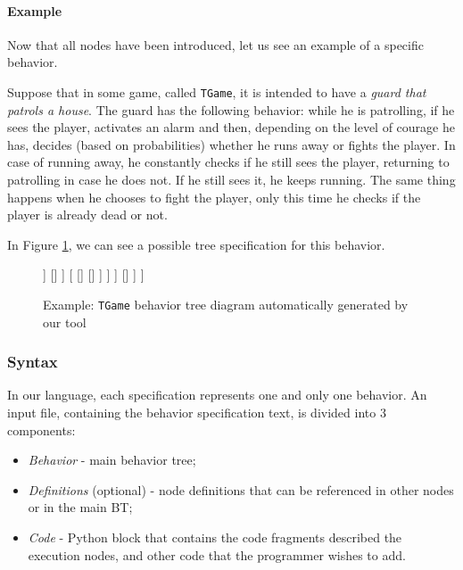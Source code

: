 \documentclass[a4paper,UKenglish,cleveref, autoref, thm-restate]{oasics-v2019}
\begin{document}
\paragraph*{Example}{
    Now that all nodes have been introduced, let us see an example of a specific behavior.

    Suppose that in some game, called \texttt{TGame}, 
    it is intended  to have a \emph{guard that patrols a house}.
    The guard has the following behavior: while he is patrolling, if he sees the player, activates an alarm and then, 
    depending on the level of courage he has, decides (based on probabilities) whether he runs away or fights the player.
    In case of running away, he constantly checks if he still sees the player, returning to patrolling in case he does not. 
    If he still sees it, he keeps running.
    The same thing happens when he chooses to fight the player, only this time he checks if the player is already dead 
    or not.

    In Figure \ref{fig:example}, we can see a possible tree specification for this behavior.

    \begin{figure}[h]
        \centering
        \begin{behavior}
            [\rootnode
                [\selector
                    [\memorysequence
                        [\condition{sees player}]
                        [\action{activate alarm}]
                        [\memoryprobselector
                            [\probnodesequence{$e1$}
                                [\inverter
                                    [\condition{player dead}]
                                ]
                                []
                            ]
                            [
                                []
                                []
                            ]
                        ]
                    ]
                    []
                ]
            ]
        \end{behavior}
        \caption{Example: \texttt{TGame} behavior tree diagram automatically generated by our tool }
        \label{fig:example}
    \end{figure}
}

\subsubsection{Syntax}
In our language, each specification represents one and only one behavior.
An  input file, containing the behavior specification text, is divided into 3 components:
\begin{itemize}
    \item \textit{Behavior} - main behavior tree;
    \item \textit{Definitions} (optional) - node definitions that can be referenced in other nodes or in the main BT;
    \item \textit{Code} - Python block that contains the code fragments described the execution nodes, and other code that the programmer wishes to add.
\end{itemize}
\end{document}
